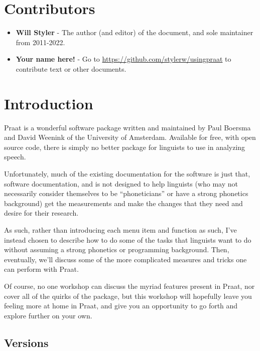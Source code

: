 \documentclass[11pt]{article}
\def\tightlist{}
\begin{document}
\hypertarget{contributors}{%
\section{Contributors}\label{contributors}}

\begin{itemize}
\tightlist
\item
  \textbf{Will Styler} - The author (and editor) of the document, and
  sole maintainer from 2011-2022.
\item
  \textbf{Your name here!} - Go to
  \url{https://github.com/stylerw/usingpraat} to contribute text or
  other documents.
\end{itemize}

\pagebreak

\hypertarget{introduction}{%
\section{Introduction}\label{introduction}}

Praat is a wonderful software package written and maintained by Paul
Boersma and David Weenink of the University of Amsterdam. Available for
free, with open source code, there is simply no better package for
linguists to use in analyzing speech.

Unfortunately, much of the existing documentation for the software is
just that, software documentation, and is not designed to help linguists
(who may not necessarily consider themselves to be ``phoneticians'' or
have a strong phonetics background) get the measurements and make the
changes that they need and desire for their research.

As such, rather than introducing each menu item and function as such,
I've instead chosen to describe how to do some of the tasks that
linguists want to do without assuming a strong phonetics or programming
background. Then, eventually, we'll discuss some of the more complicated
measures and tricks one can perform with Praat.

Of course, no one workshop can discuss the myriad features present in
Praat, nor cover all of the quirks of the package, but this workshop
will hopefully leave you feeling more at home in Praat, and give you an
opportunity to go forth and explore further on your own.

\hypertarget{versions}{%
\subsection{Versions}\label{versions}}
\end{document}
